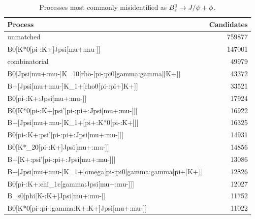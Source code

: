 \begin{table}
    \centering
    \begin{tabular}{| l | r |}
	\hline
	Process                                           &     Candidates\\
	\hline
	unmatched                                         &         759877\\
	B0[K*0[pi-:K+]Jpsi[mu+:mu-]]                      &         147001\\
	combinatorial                                              &          49979\\
	B0[Jpsi[mu+:mu-]K\_10[rho-[pi-:pi0[gamma:gamma]]K+]]&          43372\\
	B+[Jpsi[mu+:mu-]K\_1+[rho0[pi-:pi+]K+]]            &          33521\\
	B0[pi-:K+:Jpsi[mu+:mu-]]                          &          17924\\
	B0[K*0[pi-:K+]psi'[pi-:pi+:Jpsi[mu+:mu-]]]        &          16922\\
	B+[Jpsi[mu+:mu-]K\_1+[pi+:K*0[pi-:K+]]]            &          16325\\
	B0[pi-:K+:psi'[pi-:pi+:Jpsi[mu+:mu-]]]            &          14931\\
	B0[K*\_20[pi-:K+]Jpsi[mu+:mu-]]                    &          14856\\
	B+[K+:psi'[pi-:pi+:Jpsi[mu+:mu-]]]                &          13086\\
	B+[Jpsi[mu+:mu-]K\_1+[omega[pi-:pi0[gamma:gamma]pi+]K+]]&          12826\\
	B0[pi-:K+:chi\_1c[gamma:Jpsi[mu+:mu-]]]            &          12027\\
	B\_s0[phi[K-:K+]Jpsi[mu+:mu-]]                     &          11752\\
	B0[K*0[pi-:pi-:gamma:K+:K+]Jpsi[mu+:mu-]]         &          11022\\
	\hline
    \end{tabular}
    \caption{Processes most commonly misidentified as $B_{s}^{0}\rightarrow J/\psi + \phi$.}
\end{table}

